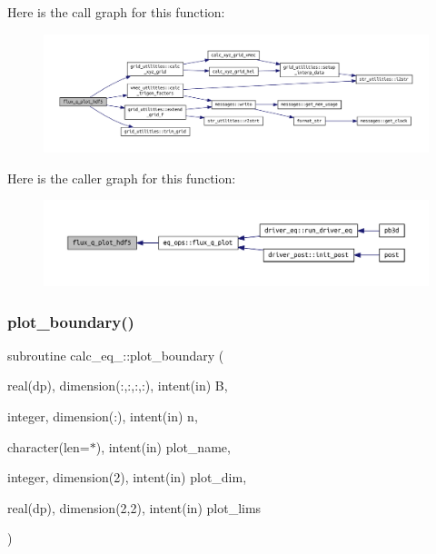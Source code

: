 Here is the call graph for this function\+:
\nopagebreak
\begin{figure}[H]
\begin{center}
\leavevmode
\includegraphics[width=350pt]{eq__ops_8f90_aed8d3363343555190699b29e393b4e23_cgraph}
\end{center}
\end{figure}
Here is the caller graph for this function\+:
\nopagebreak
\begin{figure}[H]
\begin{center}
\leavevmode
\includegraphics[width=350pt]{eq__ops_8f90_aed8d3363343555190699b29e393b4e23_icgraph}
\end{center}
\end{figure}
\mbox{\label{eq__ops_8f90_a627b6dce4cc49504cdcb156e0179f24d}} 
\subsubsection{\texorpdfstring{plot\+\_\+boundary()}{plot\_boundary()}}
{\footnotesize\ttfamily subroutine calc\+\_\+eq\+\_\+::plot\+\_\+boundary (\begin{DoxyParamCaption}\item[{real(dp), dimension(\+:,\+:,\+:,\+:), intent(in)}]{B,  }\item[{integer, dimension(\+:), intent(in)}]{n,  }\item[{character(len=$\ast$), intent(in)}]{plot\+\_\+name,  }\item[{integer, dimension(2), intent(in)}]{plot\+\_\+dim,  }\item[{real(dp), dimension(2,2), intent(in)}]{plot\+\_\+lims }\end{DoxyParamCaption})}



